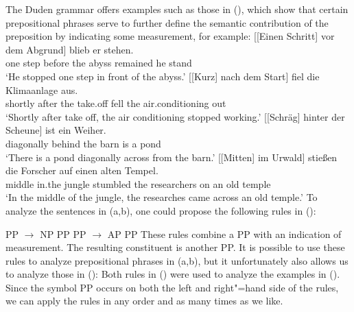 The Duden grammar \citep[\S 1300]{Duden2005-Authors} offers examples such as those in (), which show that certain prepositional phrases
serve to further define the semantic contribution of the preposition by indicating some measurement, for example:
\eal
\ex\label{Beispiel-Schritt-vor-dem-Abgrund} 
\gll {}[[Einen Schritt] vor dem Abgrund] blieb er stehen.\\
	 {}\spacebr{}\spacebr{}one step before the abyss remained he stand\\
\glt `He stopped one step in front of the abyss.'
\ex 
\gll {}[[Kurz] nach dem Start] fiel die Klimaanlage aus.\\
	 {}\spacebr{}\spacebr{}shortly after the take.off fell the air.conditioning out\\
\glt `Shortly after take off, the air conditioning stopped working.'
\ex 
\gll {}[[Schräg] hinter der Scheune] ist ein Weiher.\\
	 {}\spacebr{}\spacebr{}diagonally behind the barn is a pond\\
\glt `There is a pond diagonally across from the barn.'
\ex 
\gll {}[[Mitten] im Urwald] stießen die Forscher auf einen alten Tempel.\\
	 {}\spacebr{}\spacebr{}middle in.the jungle stumbled the researchers on an old temple\\
\glt `In the middle of the jungle, the researches came across an old temple.'
\zl
To analyze the sentences in (a,b), one could propose the following rules in ():

\eal
\ex PP $\to$ NP PP
\ex PP $\to$ AP PP
\zl
These rules combine a PP with an indication of measurement. The resulting constituent is another PP. It is
possible to use these rules to analyze prepositional phrases in (a,b), but it unfortunately also allows
us to analyze those in ():
\eal
{}
\zl
Both rules in () were used to analyze the examples in (). Since the symbol PP occurs on both the left 
and right"=hand side of the rules, we can apply the rules in any order and as many times as we like.

